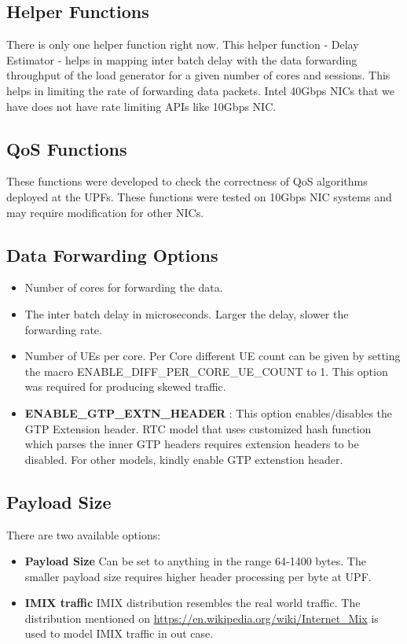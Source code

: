 \documentclass{article}
\begin{document}
\subsection{Helper Functions}
There is only one helper function right now. This helper function - Delay Estimator - helps in mapping inter batch delay with the data forwarding throughput of the load generator for a given number of cores and sessions. This helps in limiting the rate of forwarding data packets. Intel 40Gbps NICs that we have does not have rate limiting APIs like 10Gbps NIC.

\subsection{QoS Functions}
These functions were developed to check the correctness of QoS algorithms deployed at the UPFs. These functions were tested on 10Gbps NIC systems and may require modification for other NICs.

\subsection{Data Forwarding Options}
\begin{itemize}
    \item Number of cores for forwarding the data.
    \item The inter batch delay in microseconds. Larger the delay, slower the forwarding rate.
    \item Number of UEs per core. Per Core different UE count can be given by setting the macro ENABLE\_DIFF\_PER\_CORE\_UE\_COUNT to 1. This option was required for producing skewed traffic.
    \item \textbf{ENABLE\_GTP\_EXTN\_HEADER} : This option enables/disables the GTP Extension header. RTC model that uses customized hash function which parses the inner GTP headers requires extension headers to be disabled. For other models, kindly enable GTP extenstion header.
\end{itemize}
\subsection{Payload Size}
There are two available options:
\begin{itemize}
    \item \textbf{Payload Size} Can be set to anything in the range 64-1400 bytes. The smaller payload size requires higher header processing per byte at UPF. 
    \item \textbf{IMIX traffic} IMIX distribution resembles the real world traffic. The distribution mentioned on \url{https://en.wikipedia.org/wiki/Internet_Mix} is used to model IMIX traffic in out case. 
\end{itemize}
\end{document}
